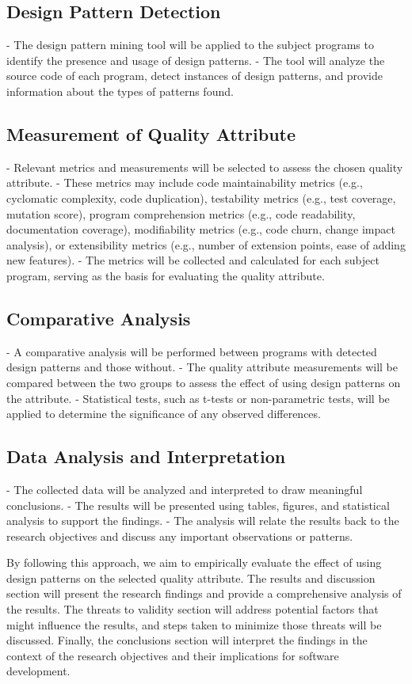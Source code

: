 \documentclass[conference]{IEEEtran}
\begin{document}
	\subsection{Design Pattern Detection}
	- The design pattern mining tool will be applied to the subject programs to identify the presence and usage of design patterns.
	- The tool will analyze the source code of each program, detect instances of design patterns, and provide information about the types of patterns found.
	
	\subsection{Measurement of Quality Attribute} 
	- Relevant metrics and measurements will be selected to assess the chosen quality attribute.
	- These metrics may include code maintainability metrics (e.g., cyclomatic complexity, code duplication), testability metrics (e.g., test coverage, mutation score), program comprehension metrics (e.g., code readability, documentation coverage), modifiability metrics (e.g., code churn, change impact analysis), or extensibility metrics (e.g., number of extension points, ease of adding new features).
	- The metrics will be collected and calculated for each subject program, serving as the basis for evaluating the quality attribute.
	
	\subsection{Comparative Analysis} 
	- A comparative analysis will be performed between programs with detected design patterns and those without.
	- The quality attribute measurements will be compared between the two groups to assess the effect of using design patterns on the attribute.
	- Statistical tests, such as t-tests or non-parametric tests, will be applied to determine the significance of any observed differences.
	
	\subsection{Data Analysis and Interpretation} 
	- The collected data will be analyzed and interpreted to draw meaningful conclusions.
	- The results will be presented using tables, figures, and statistical analysis to support the findings.
	- The analysis will relate the results back to the research objectives and discuss any important observations or patterns.
	
	By following this approach, we aim to empirically evaluate the effect of using design patterns on the selected quality attribute. The results and discussion section will present the research findings and provide a comprehensive analysis of the results. The threats to validity section will address potential factors that might influence the results, and steps taken to minimize those threats will be discussed. Finally, the conclusions section will interpret the findings in the context of the research objectives and their implications for software development.
	
\end{document}
